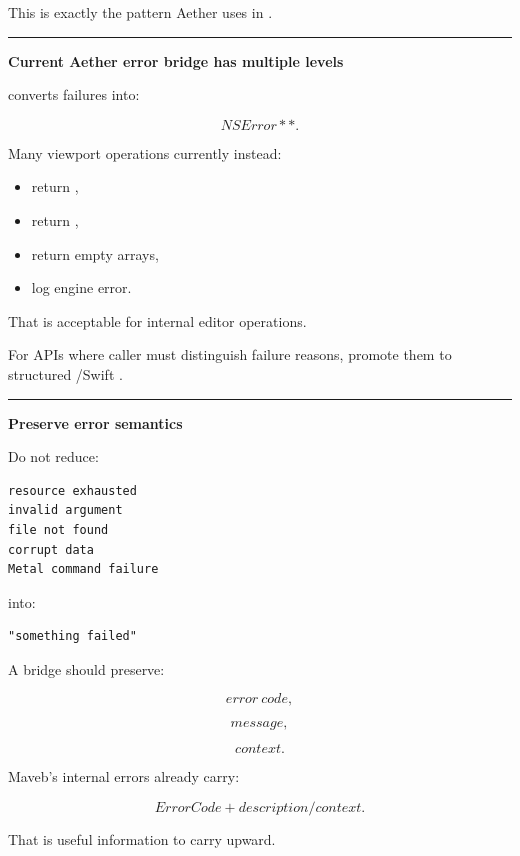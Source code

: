 This is exactly the pattern Aether uses in .

\begin{center}\rule{0.5\linewidth}{0.5pt}\end{center}

\textbf{Current Aether error bridge has multiple levels}

 converts failures into:

\[
NSError**.
\]

Many viewport operations currently instead:

\begin{itemize}
\tightlist
\item
  return ,
\item
  return ,
\item
  return empty arrays,
\item
  log engine error.
\end{itemize}

That is acceptable for internal editor operations.

For APIs where caller must distinguish failure reasons, promote them to structured /Swift .

\begin{center}\rule{0.5\linewidth}{0.5pt}\end{center}

\textbf{Preserve error semantics}

Do not reduce:

\begin{verbatim}
resource exhausted
invalid argument
file not found
corrupt data
Metal command failure
\end{verbatim}

into:

\begin{verbatim}
"something failed"
\end{verbatim}

A bridge should preserve:

\[
error\ code,
\]

\[
message,
\]

\[
context.
\]

Maveb's internal errors already carry:

\[
ErrorCode
+
description/context.
\]

That is useful information to carry upward.

